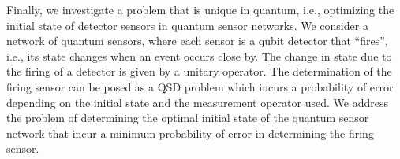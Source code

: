 Finally, we investigate a problem that is unique in quantum, i.e., optimizing the initial state of detector sensors 
in quantum sensor networks. We consider a network of quantum sensors, where each sensor is a qubit detector that “fires”, 
i.e., its state changes when an event occurs close by. The change in state due to the firing of a detector is given 
by a unitary operator. The determination of the firing sensor can be posed as a QSD problem which incurs a probability 
of error depending on the initial state and the measurement operator used. We address the problem of determining 
the optimal initial state of the quantum sensor network that incur a minimum probability of error in determining the firing sensor.

